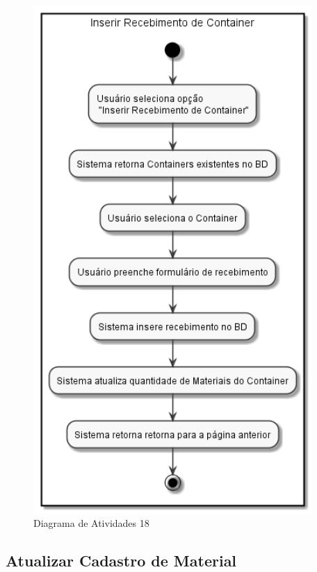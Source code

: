 \documentclass[rascunho,xindy,acronym,symbols]{fei}
\begin{document}
\begin{figure}[H]
    \centering
    \includegraphics[scale=0.6, width=300pt]{./Images/Inserir_Recebimento_de_Container.png}
    \caption{Diagrama de Atividades 18}
    \label{fig:diag_atv18}
\end{figure}

\subsection{Atualizar Cadastro de Material}
\end{document}
